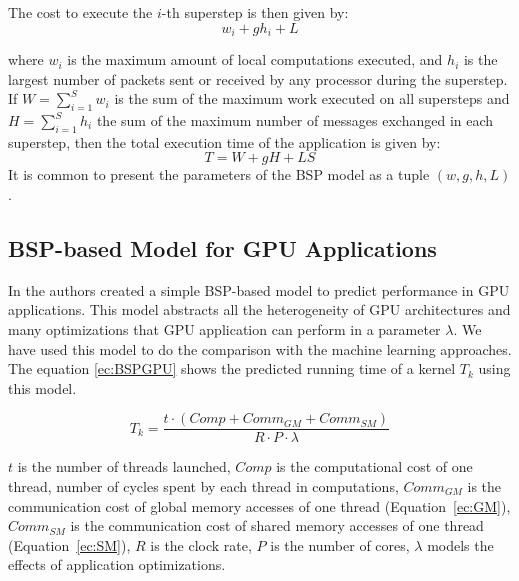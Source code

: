 
The cost to execute the $i$-th superstep is then given by:
\begin{equation}
  \label{eq:superstep-cost}
  w_i + g h_i + L
\end{equation}

where $w_i$ is the maximum amount of local computations executed, and $h_i$ is the largest number of packets sent or received by any processor during the superstep. If $W = \sum_{i=1}^{S} w_i$ is the sum of the maximum work executed on all supersteps and $H = \sum_{i=1}^{S} h_i$ the sum of the maximum number of messages exchanged in each superstep, then the total execution time of the application is given by:
\begin{equation}
  \label{ec:BSP}
  T = W + g H + L S
\end{equation}
It is common to present the parameters of the BSP model as a tuple $(w,g,h,L)$.

\subsection{BSP-based Model for GPU Applications}\label{ssec:GPUModel}
In \cite{BSPGPUCache:2015} the authors created a simple BSP-based model to predict performance in GPU applications. This model abstracts all the heterogeneity of GPU architectures and many optimizations that GPU application can perform in a parameter $\lambda$. We have used this model to do the comparison with the machine learning approaches. The equation \ref{ec:BSPGPU} shows the predicted running time of a kernel $T_k$ using this model.

\begin{equation}\label{ec:BSPGPU}
T_k = \frac{t \cdot (Comp + Comm_{GM} + Comm_{SM})}{R \cdot P \cdot \lambda}
\end{equation} 

 \noindent $t$ is the number of threads launched, $Comp$ is the computational cost of one thread, number of cycles spent by each thread in computations, $Comm_{GM}$ is the communication cost of global memory accesses of one thread (Equation~\ref{ec:GM}), $Comm_{SM}$ is the communication cost of shared memory accesses of one thread (Equation~\ref{ec:SM}), $R$ is the clock rate, $P$ is the number of cores, $\lambda$ models the effects of application optimizations.

